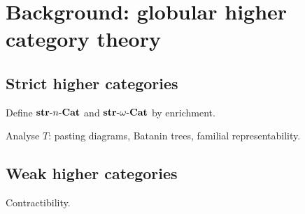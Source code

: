 
\chapter{Background: globular higher category theory}


\section{Strict higher categories}

\para Define $\strnCat$ and $\strnCat[\omega]$ by enrichment. 

\para Analyse $T$: pasting diagrams, Batanin trees, familial representability.

\section{Weak higher categories}

\para Contractibility.




